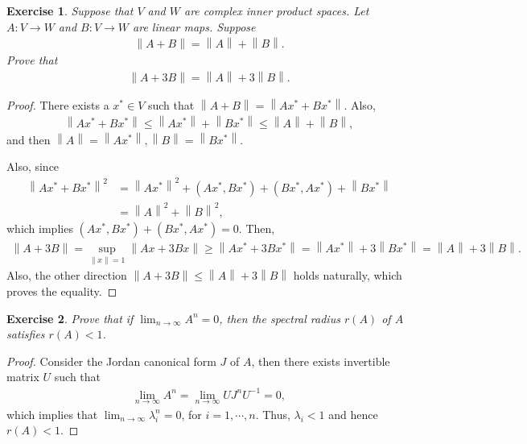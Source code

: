 \documentclass[11pt]{book}
\newtheorem{exercise}{Exercise}[section]
\theoremstyle{definition}
\numberwithin{equation}{chapter}
\begin{document}
\medskip

\begin{exercise}
Suppose that $V$ and $W$ are complex inner product spaces. Let $A: V \to W$ and $B:V \to W$ are linear maps. Suppose 
\begin{align*}
    \left\|A + B\right\| = \left\|A\right\| + \left\|B\right\|.
\end{align*}
Prove that
\begin{align*}
    \left\|A + 3B\right\| = \left\|A\right\| + 3\left\|B\right\|.
\end{align*}
\end{exercise}
\begin{proof}
There exists a $x^* \in V$ such that $\left\|A + B\right\| = \left\|Ax^* + Bx^*\right\|$. Also,
\begin{align*}
    \left\|Ax^* + Bx^*\right\| \leq \left\|Ax^*\right\| + \left\|Bx^*\right\| \leq \left\|A\right\| + \left\|B\right\|,
\end{align*}
and then $\left\|A\right\| = \left\|Ax^*\right\|, \left\|B\right\| = \left\|Bx^*\right\|$. 

Also, since
\begin{align*}
    \left\|Ax^* + Bx^*\right\|^2 & = \left\|Ax^*\right\|^2 + (Ax^*,Bx^*) + (Bx^*,Ax^*) + \left\|Bx^*\right\| \\
    & = \left\|A\right\|^2 + \left\|B\right\|^2,
\end{align*}
which implies $(Ax^*, Bx^*) + (Bx^*, Ax^*) = 0$. Then,
\begin{align*}
    \left\|A + 3B\right\| = \sup_{\|x\| = 1} \left\|Ax + 3Bx\right\| \geq \left\|Ax^* + 3Bx^*\right\| = \left\|Ax^*\right\| + 3\left\|Bx^*\right\| = \left\|A\right\| + 3 \left\|B\right\|.
\end{align*}
Also, the other direction $\left\|A + 3B\right\| \leq \left\|A\right\| + 3 \left\|B\right\|$ holds naturally, which proves the equality.
\end{proof}

\medskip

\begin{exercise}
Prove that if $\lim_{n\to\infty} A^n = 0$, then the spectral radius $r(A)$ of $A$ satisfies $r(A) < 1$.
\end{exercise}
\begin{proof}
Consider the Jordan canonical form $J$ of $A$, then there exists invertible matrix $U$ such that 
\begin{align*}
    \lim_{n \to \infty} A^n = \lim_{n \to \infty} U J^n U^{-1} = 0,
\end{align*}
which implies that $\lim_{n \to \infty} \lambda_i^n = 0$, for $i = 1, \cdots, n$. Thus, $\lambda_i < 1$ and hence $r(A) < 1$.
\end{proof}
\end{document}
